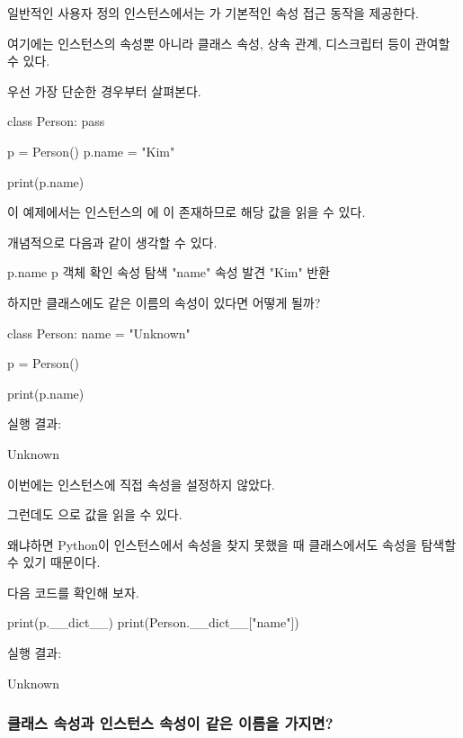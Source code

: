 일반적인 사용자 정의 인스턴스에서는 가 기본적인 속성 접근 동작을 제공한다.

여기에는 인스턴스의 속성뿐 아니라 클래스 속성, 상속 관계, 디스크립터 등이 관여할 수 있다.

우선 가장 단순한 경우부터 살펴본다.

\begin{dhkcode}
class Person:
    pass

p = Person()
p.name = "Kim"

print(p.name)
\end{dhkcode}

이 예제에서는 인스턴스의 에 이 존재하므로 해당 값을 읽을 수 있다.

개념적으로 다음과 같이 생각할 수 있다.

\begin{dhksmry}[centered]
p.name
\da
p 객체 확인
\da
속성 탐색
\da
"name" 속성 발견
\da
"Kim" 반환
\end{dhksmry}

하지만 클래스에도 같은 이름의 속성이 있다면 어떻게 될까?

\begin{dhkcode}
class Person:
    name = "Unknown"

p = Person()

print(p.name)
\end{dhkcode}

실행 결과:

\begin{dhkzsh}
Unknown
\end{dhkzsh}

이번에는 인스턴스에 직접  속성을 설정하지 않았다.

그런데도 으로 값을 읽을 수 있다.

왜냐하면 Python이 인스턴스에서 속성을 찾지 못했을 때 클래스에서도 속성을 탐색할 수 있기 때문이다.

다음 코드를 확인해 보자.

\begin{dhkcode}
print(p.__dict__)
print(Person.__dict__["name"])
\end{dhkcode}

실행 결과:

\begin{dhkzsh}
{}
Unknown
\end{dhkzsh}

\subsubsection{클래스 속성과 인스턴스 속성이 같은 이름을 가지면?}

